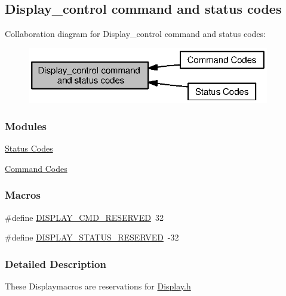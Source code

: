 \subsection{Display\+\_\+control command and status codes}
\label{group___d_i_s_p_l_a_y___c_o_n_t_r_o_l}
Collaboration diagram for Display\+\_\+control command and status codes\+:
\nopagebreak
\begin{figure}[H]
\begin{center}
\leavevmode
\includegraphics[width=299pt]{group___d_i_s_p_l_a_y___c_o_n_t_r_o_l}
\end{center}
\end{figure}
\subsubsection*{Modules}
\begin{DoxyCompactItemize}
\item 
\hyperlink{group___d_i_s_p_l_a_y___s_t_a_t_u_s}{Status Codes}
\item 
\hyperlink{group___d_i_s_p_l_a_y___c_m_d}{Command Codes}
\end{DoxyCompactItemize}
\subsubsection*{Macros}
\begin{DoxyCompactItemize}
\item 
\#define \hyperlink{group___d_i_s_p_l_a_y___c_o_n_t_r_o_l_ga99c2401cd11ea3b49e5e3e4ffac5c886}{D\+I\+S\+P\+L\+A\+Y\+\_\+\+C\+M\+D\+\_\+\+R\+E\+S\+E\+R\+V\+E\+D}~32
\item 
\#define \hyperlink{group___d_i_s_p_l_a_y___c_o_n_t_r_o_l_gacb7031dd18c19e3ecb86d97cb7b17abb}{D\+I\+S\+P\+L\+A\+Y\+\_\+\+S\+T\+A\+T\+U\+S\+\_\+\+R\+E\+S\+E\+R\+V\+E\+D}~-\/32
\end{DoxyCompactItemize}


\subsubsection{Detailed Description}
These Displaymacros are reservations for \hyperlink{_display_8h}{Display.\+h} 

